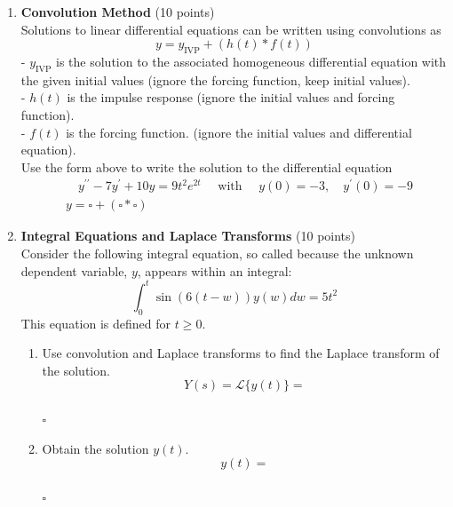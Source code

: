\begin{enumerate}
  \newpage

  \item \textbf{Convolution Method} (10 points)\\
  Solutions to linear differential equations can be written using convolutions as
  $$
  y=y_{\mathrm{IVP}}+(h(t) * f(t))
  $$
  - $y_{\mathrm{IVP}}$ is the solution to the associated homogeneous differential equation with the given initial values
  (ignore the forcing function, keep initial values).\\
  - $h(t)$ is the impulse response
  (ignore the initial values and forcing function).\\
  - $f(t)$ is the forcing function.
  (ignore the initial values and differential equation).\\
  Use the form above to write the solution to the differential equation
  $$
  \begin{aligned}
  & \quad y^{\prime \prime}-7 y^{\prime}+10 y=9 t^2 e^{2 t} \quad \text { with } \quad y(0)=-3, \quad y^{\prime}(0)=-9 \\
  & y=\square+(\square * \square)
  \end{aligned}
  $$
  \begin{subanswer}
  \end{subanswer}

  \item \textbf{Integral Equations and Laplace Transforms} (10 points)\\
  Consider the following integral equation, so called because the unknown dependent variable, $y$, appears within an integral:
  $$
  \int_0^t \sin (6(t-w)) y(w) d w=5 t^2
  $$
  This equation is defined for $t \geq 0$.
  \begin{enumerate}[label=(\alph*)]
    \item Use convolution and Laplace transforms to find the Laplace transform of the solution.\\
    $$
    Y(s)=\mathcal{L}\{y(t)\}=
    $$\\
    $\square$\\
    \begin{subanswer}
    \end{subanswer}
    \item Obtain the solution $y(t)$.\\
    $$
    y(t)=
    $$\\
    $\square$\\
    \begin{subanswer}
    \end{subanswer}
  \end{enumerate}


\end{enumerate}
